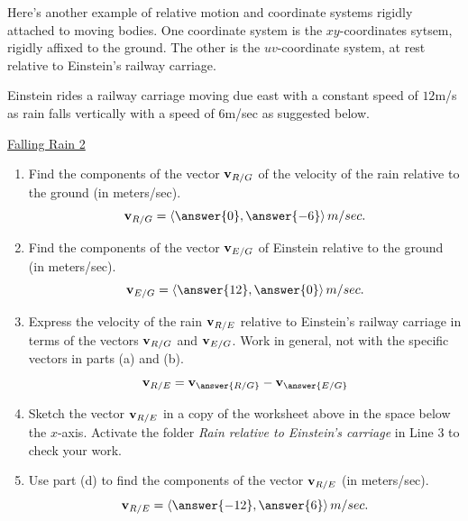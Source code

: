 \documentclass{ximera}
\begin{document}

Here's another example of relative motion and coordinate systems rigidly attached to moving bodies. One coordinate system is the $xy$-coordinates sytsem, rigidly affixed to the ground. The other is the $uv$-coordinate system, at rest relative to Einstein's railway carriage.

\begin{question} \label{Edsfdf4tDE}

Einstein rides a railway carriage moving due east with a constant speed of $12$m/s as rain falls vertically with a speed of $6$m/sec as suggested below.

\begin{onlineOnly}
    \begin{center}
\end{center}
\end{onlineOnly}

\href{https://www.desmos.com/calculator/ga6zcv9vkr}{Falling Rain 2}

\begin{enumerate}
\item Find the components of the vector ${\bf v}_{R/G}$ of the velocity of the rain relative to the ground (in meters/sec).
\[
   {\bf v}_{R/G} = \langle \answer{0}, \answer{-6} \rangle \, m/sec. 
\] 

\item Find the components of the vector ${\bf v}_{E/G}$ of Einstein relative to the ground (in meters/sec).
\[
   {\bf v}_{E/G} = \langle \answer{12}, \answer{0} \rangle \, m/sec. 
\] 

\item Express the velocity of the rain ${\bf v}_{R/E}$ relative to Einstein's railway carriage in terms of the vectors ${\bf v}_{R/G}$ and ${\bf v}_{E/G}$. Work in general, not with the specific vectors in parts (a) and (b).
\[
      {\bf v}_{R/E} = {\bf v}_{\answer{R/G}} - {\bf v}_{\answer{E/G}}
\]

\item Sketch the vector ${\bf v}_{R/E}$ in a copy of the worksheet above in the space below the $x$-axis. Activate the folder \emph{Rain relative to Einstein's carriage} in Line 3 to check your work.

\item Use part (d) to find the components of the vector ${\bf v}_{R/E}$ (in meters/sec).
\[
   {\bf v}_{R/E} = \langle \answer{-12}, \answer{6} \rangle \, m/sec. 
\]


\end{enumerate}
\end{question}
\end{document}
